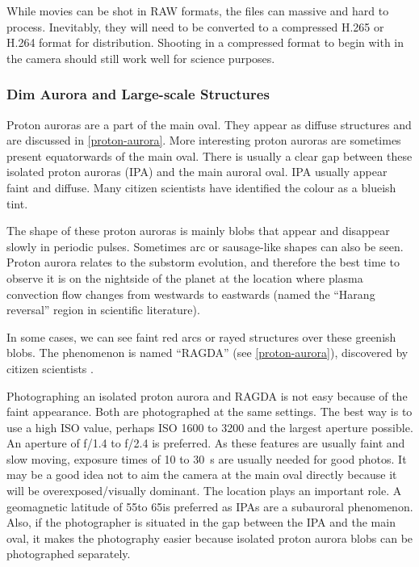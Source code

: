\documentclass{article}
\renewcommand{\cite}[1]{\parencite{#1}}
\begin{document}
While movies can be shot in RAW formats, the files can massive and hard to process. Inevitably, they will need to be converted to a compressed H.265 or H.264 format for distribution. Shooting in a compressed format to begin with in the camera should still work well for science purposes.

\subsubsection{Dim Aurora and Large-scale Structures}\label{DimAurora}


Proton auroras are a part of the main oval. They appear as diffuse structures and are discussed in \ref{proton-aurora}. More interesting proton auroras are sometimes present equatorwards of the main oval. There is usually a clear gap between these isolated proton auroras (IPA) and the main auroral oval. IPA usually appear faint and diffuse. Many citizen scientists have identified the colour as a blueish tint. 

The shape of these proton auroras is mainly blobs that appear and disappear slowly in periodic pulses. Sometimes arc or sausage-like shapes can also be seen. Proton aurora relates to the substorm evolution, and therefore the best time to observe it is on the nightside of the planet at the location where plasma convection flow changes from westwards to eastwards (named the ``Harang reversal'' region in scientific literature).

In some cases, we can see faint red arcs or rayed structures over these greenish blobs. The phenomenon is named ``RAGDA'' (see \ref{proton-aurora}), discovered by citizen scientists \cite{Nishimura2022}. 

Photographing an isolated proton aurora and RAGDA is not easy because of the faint appearance. Both are photographed at the same settings. The best way is to use a high ISO value, perhaps ISO 1600 to 3200 and the largest aperture possible. An aperture of f/1.4 to f/2.4 is preferred. As these features are usually faint and slow moving, exposure times of 10 to 30~s are usually needed for good photos. It may be a good idea not to aim the camera at the main oval directly because it will be overexposed/visually dominant. The location plays an important role. A geomagnetic latitude of 55\textdegree to 65\textdegree is preferred as IPAs are a subauroral phenomenon. Also, if the photographer is situated in the gap between the IPA and the main oval, it makes the photography easier because isolated proton aurora blobs can be photographed separately.
\end{document}
